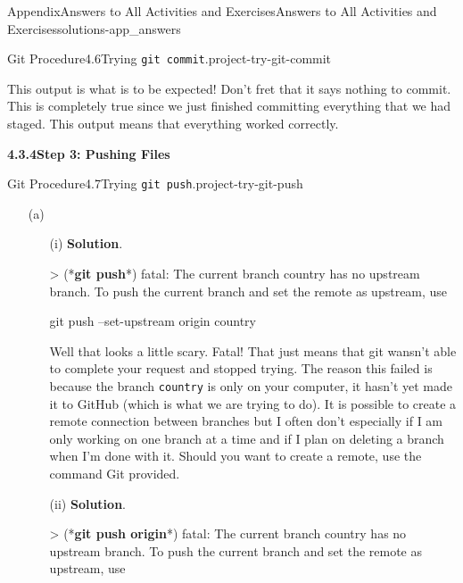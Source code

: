 \documentclass[twoside,10pt,]{book}
\newcommand{\blocktitlefont}{\relax}
\newcommand{\mono}[1]{\texttt{#1}}
\newcommand{\consoleinput}[1]{\textbf{#1}}
\begin{document}
\begin{solutions-chapter}{Appendix}{Answers to All Activities and Exercises}{}{Answers to All Activities and Exercises}{}{}{solutions-app_answers}
\begin{projectsolution}{Git Procedure}{4.6}{Trying \mono{git commit}.}{project-try-git-commit}
\begin{enumerate}[font=\bfseries,label=(\alph*),ref=\alph*]
This output is what is to be expected! Don't fret that it says nothing to commit. This is completely true since we just finished committing everything that we had staged. This output means that everything worked correctly.%
\end{enumerate}%
\end{projectsolution}%
\par\medskip
\noindent\textbf{\Large{}4.3.4\space\textperiodcentered\space{}Step 3: Pushing Files}
\begin{projectsolution}{Git Procedure}{4.7}{Trying \mono{git push}.}{project-try-git-push}%
\begin{enumerate}[font=\bfseries,label=(\alph*),ref=\alph*]%
\item[(a)]\begin{enumerate}[font=\bfseries,label=(\roman*),ref=\theenumi.\roman*]%
\item[(i)]\noindent\textbf{\blocktitlefont Solution}.\hypertarget{solution-try-git-push-c-b-b-back}{}\quad{}\begin{console}{0}{1}{0}
> (*\consoleinput{git push}*)
fatal: The current branch country has no upstream branch.
To push the current branch and set the remote as upstream, use

    git push --set-upstream origin country
\end{console}
Well that looks a little scary. Fatal! That just means that git wansn't able to complete your request and stopped trying. The reason this failed is because the branch \mono{country} is only on your computer, it hasn't yet made it to GitHub (which is what we are trying to do). It is possible to create a remote connection between branches but I often don't especially if I am only working on one branch at a time and if I plan on deleting a branch when I'm done with it. Should you want to create a remote, use the command Git provided.%
\item[(ii)]\noindent\textbf{\blocktitlefont Solution}.\hypertarget{solution-try-git-push-c-c-b-back}{}\quad{}\begin{console}{0}{1}{0}
> (*\consoleinput{git push origin}*)
fatal: The current branch country has no upstream branch.
To push the current branch and set the remote as upstream, use


\end{console}
\end{enumerate}
\end{enumerate}
\end{projectsolution}
\end{solutions-chapter}
\end{document}
